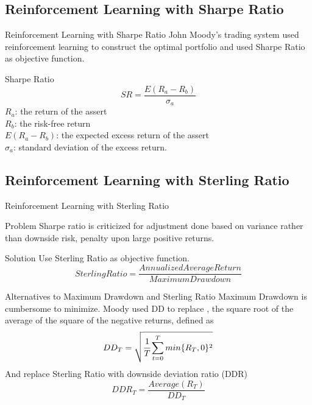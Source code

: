 \subsection{Reinforcement Learning with Sharpe Ratio}
\begin{frame}{Reinforcement Learning with Sharpe Ratio}
John Moody's trading system used reinforcement learning to construct the optimal portfolio and used Sharpe Ratio as objective function.

\begin{block}{Sharpe Ratio}
\[ SR = \frac{E(R_a - R_b)}{\sigma_a}\]
\(R_a\): the return of the assert
\\
\(R_b\): the risk-free return
\\
\(E(R_a - R_b)\): the expected excess return of the assert
\\
\(\sigma_a\): standard deviation of the excess return.
\end{block}
\end{frame}



\subsection{Reinforcement Learning with Sterling Ratio}
\begin{frame}{Reinforcement Learning with Sterling Ratio}
\begin{block}{Problem}
Sharpe ratio is criticized for adjustment done based on variance rather than downside risk, \alert {penalty upon large positive returns}.
\end{block}
\begin{block}{Solution}
Use Sterling Ratio as objective function.
\[
Sterling Ratio=\frac{Annualized Average Return}{Maximum Drawdown}
\]
\end{block}

\end{frame}

\begin{frame}{Alternatives to Maximum Drawdown and  Sterling Ratio}
Maximum Drawdown is cumbersome to minimize.
Moody used DD to replace , the square root of the average of the
square of the negative returns, defined as
\[
DD_T = \sqrt{\cfrac{1}{T}\sum_{t=0}^{T}{min\{R_T,0\}^2}}
\]
And replace Sterling Ratio with downside deviation ratio (DDR)
\[
DDR_T = \frac{Average(R_T)}{DD_T}
\]
\end{frame}




